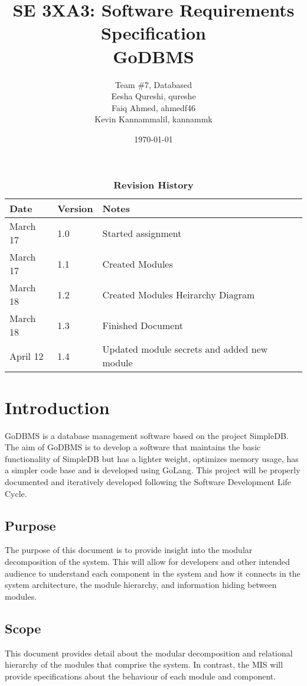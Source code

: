 \documentclass[12pt, titlepage]{article}
\title{SE 3XA3: Software Requirements Specification\\GoDBMS}
\author{Team \#7, Databased
		\\ Eesha Qureshi, qureshe 
		\\ Faiq Ahmed, ahmedf46 
		\\ Kevin Kannammalil, kannammk
}
\date{\today}
\begin{document}
\maketitle

\tableofcontents
\listoftables
\listoffigures

\begin{table}[H]
\caption{\bf Revision History}
\begin{tabularx}{\textwidth}{p{3cm}p{2cm}X}
\toprule {\bf Date} & {\bf Version} & {\bf Notes}\\
\midrule
March 17 & 1.0 & Started assignment\\
March 17 & 1.1 & Created Modules\\
March 18 & 1.2 & Created Modules Heirarchy Diagram\\
March 18 & 1.3 & Finished Document\\
{\color{red}April 12} & {\color{red}1.4} & {\color{red}Updated module secrets and added new module}\\
\bottomrule
\end{tabularx}
\end{table}

\newpage


\section{Introduction}

GoDBMS is a database management software based on the project SimpleDB. The aim of GoDBMS is to develop a software that maintains the basic functionality of SimpleDB but has a lighter weight, optimizes memory usage, has a simpler code base and is developed using GoLang. This project will be properly documented and iteratively developed following the Software Development Life Cycle.

\subsection{Purpose}

The purpose of this document is to provide insight into the modular decomposition of the system. This will allow for developers and other intended audience to understand each component in the system and how it connects in the system architecture, the module hierarchy, and information hiding between modules. 

\subsection{Scope}
This document provides detail about the modular decomposition and relational hierarchy of the modules that comprise the system. In contrast, the MIS will provide specifications about the behaviour of each module and component.
\end{document}
